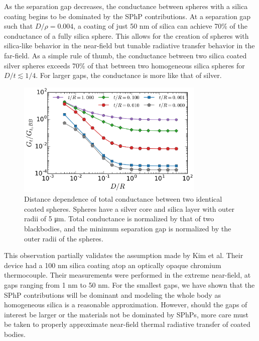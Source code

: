 As the separation gap decreases, the conductance between spheres with a silica coating begins to be dominated by the SPhP contributions. At a separation gap such that $D/\rho=0.004$, a coating of just 50 \si{\nano\meter} of silica can achieve 70\% of the conductance of a fully silica sphere. This allows for the creation of spheres with silica-like behavior in the near-field but tunable radiative transfer behavior in the far-field. As a simple rule of thumb, the conductance between two silica coated silver spheres exceeds 70\% of that between two homogeneous silica spheres for $D/t \lesssim 1/4$. For larger gaps, the conductance is more like that of silver.

\begin{figure}
\centering
\includegraphics[width=0.8\textwidth]{./Figures/figure3.png}
\caption{\label{fig:TotalConductance} Distance dependence of total conductance between two identical coated spheres. Spheres have a silver core and silica layer with outer radii of 5 \si{\micro\meter}. Total conductance is normalized by that of two blackbodies, and the minimum separation gap is normalized by the outer radii of the spheres.}
\end{figure}

This observation partially validates the assumption made by Kim et al.\cite{Kim2015} Their device had a 100 \si{\nano\meter} silica coating atop an optically opaque chromium thermocouple. Their measurements were performed in the extreme near-field, at gaps ranging from 1 \si{\nano\meter} to 50 \si{\nano\meter}. For the smallest gaps, we have shown that the SPhP contributions will be dominant and modeling the whole body as homogeneous silica is a reasonable approximation. However, should the gaps of interest be larger or the materials not be dominated by SPhPs, more care must be taken to properly approximate near-field thermal radiative transfer of coated bodies.

